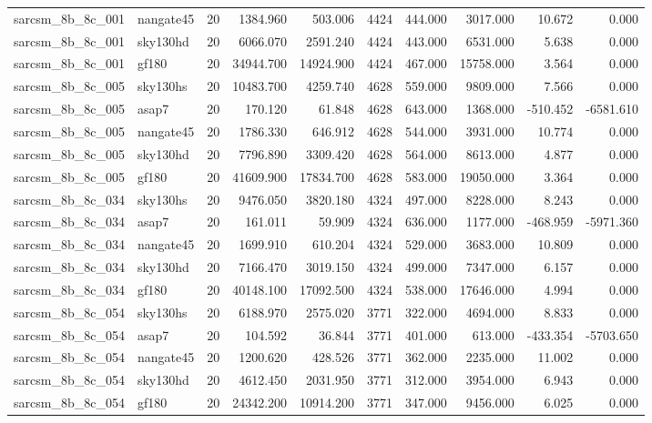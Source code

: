 \begin{longtable}{llrrrrrrrr}
sarcsm\_8b\_8c\_001 & nangate45 & 20 & 1384.960 & 503.006 & 4424 & 444.000 & 3017.000 & 10.672 & 0.000 \\
sarcsm\_8b\_8c\_001 & sky130hd & 20 & 6066.070 & 2591.240 & 4424 & 443.000 & 6531.000 & 5.638 & 0.000 \\
sarcsm\_8b\_8c\_001 & gf180 & 20 & 34944.700 & 14924.900 & 4424 & 467.000 & 15758.000 & 3.564 & 0.000 \\
sarcsm\_8b\_8c\_005 & sky130hs & 20 & 10483.700 & 4259.740 & 4628 & 559.000 & 9809.000 & 7.566 & 0.000 \\
sarcsm\_8b\_8c\_005 & asap7 & 20 & 170.120 & 61.848 & 4628 & 643.000 & 1368.000 & -510.452 & -6581.610 \\
sarcsm\_8b\_8c\_005 & nangate45 & 20 & 1786.330 & 646.912 & 4628 & 544.000 & 3931.000 & 10.774 & 0.000 \\
sarcsm\_8b\_8c\_005 & sky130hd & 20 & 7796.890 & 3309.420 & 4628 & 564.000 & 8613.000 & 4.877 & 0.000 \\
sarcsm\_8b\_8c\_005 & gf180 & 20 & 41609.900 & 17834.700 & 4628 & 583.000 & 19050.000 & 3.364 & 0.000 \\
sarcsm\_8b\_8c\_034 & sky130hs & 20 & 9476.050 & 3820.180 & 4324 & 497.000 & 8228.000 & 8.243 & 0.000 \\
sarcsm\_8b\_8c\_034 & asap7 & 20 & 161.011 & 59.909 & 4324 & 636.000 & 1177.000 & -468.959 & -5971.360 \\
sarcsm\_8b\_8c\_034 & nangate45 & 20 & 1699.910 & 610.204 & 4324 & 529.000 & 3683.000 & 10.809 & 0.000 \\
sarcsm\_8b\_8c\_034 & sky130hd & 20 & 7166.470 & 3019.150 & 4324 & 499.000 & 7347.000 & 6.157 & 0.000 \\
sarcsm\_8b\_8c\_034 & gf180 & 20 & 40148.100 & 17092.500 & 4324 & 538.000 & 17646.000 & 4.994 & 0.000 \\
sarcsm\_8b\_8c\_054 & sky130hs & 20 & 6188.970 & 2575.020 & 3771 & 322.000 & 4694.000 & 8.833 & 0.000 \\
sarcsm\_8b\_8c\_054 & asap7 & 20 & 104.592 & 36.844 & 3771 & 401.000 & 613.000 & -433.354 & -5703.650 \\
sarcsm\_8b\_8c\_054 & nangate45 & 20 & 1200.620 & 428.526 & 3771 & 362.000 & 2235.000 & 11.002 & 0.000 \\
sarcsm\_8b\_8c\_054 & sky130hd & 20 & 4612.450 & 2031.950 & 3771 & 312.000 & 3954.000 & 6.943 & 0.000 \\
sarcsm\_8b\_8c\_054 & gf180 & 20 & 24342.200 & 10914.200 & 3771 & 347.000 & 9456.000 & 6.025 & 0.000 \\

\end{longtable}
